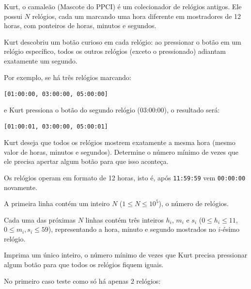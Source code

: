 Kurt, o camaleão (Mascote do PPCI) é um colecionador de relógios antigos. Ele possui $N$ relógios, cada um marcando uma hora diferente em mostradores de 12 horas, com ponteiros de horas, minutos e segundos. 

Kurt descobriu um botão curioso em cada relógio: ao pressionar o botão em um relógio específico, todos os outros relógios (exceto o pressionado) adiantam exatamente um segundo. 

Por exemplo, se há três relógios marcando:

\begin{center}
\texttt{[01:00:00, 03:00:00, 05:00:00]}
\end{center}
e Kurt pressiona o botão do segundo relógio (03:00:00), o resultado será:
\begin{center}
\texttt{[01:00:01, 03:00:00, 05:00:01]}
\end{center}

Kurt deseja que todos os relógios mostrem exatamente a mesma hora (mesmo valor de horas, minutos e segundos).  
Determine o número mínimo de vezes que ele precisa apertar algum botão para que isso aconteça.

Os relógios operam em formato de 12 horas, isto é, após \texttt{11:59:59} vem \texttt{00:00:00} novamente.

A primeira linha contém um inteiro $N$ ($1 \leq N \leq 10^5$), o número de relógios.  

Cada uma das próximas $N$ linhas contém três inteiros $h_i$, $m_i$ e $s_i$ ($0 \le h_i \le 11$, $0 \le m_i, s_i \le 59$), representando a hora, minuto e segundo mostrados no $i$-ésimo relógio.

Imprima um único inteiro, o número mínimo de vezes que Kurt precisa pressionar algum botão para que todos os relógios fiquem iguais.

No primeiro caso teste como só há apenas $2$ relógios: 

